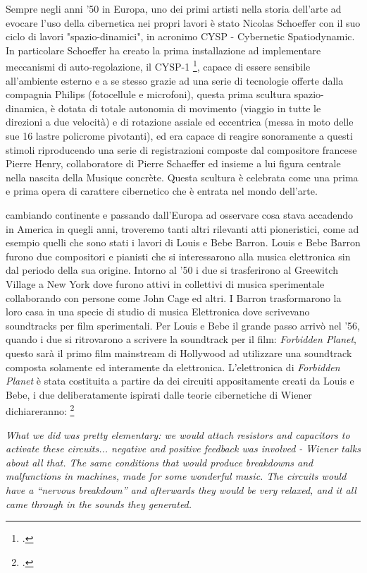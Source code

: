 Sempre negli anni '50 in Europa, uno dei primi artisti nella storia dell'arte
ad evocare l'uso della cibernetica nei propri lavori è stato
Nicolas Schoeffer con il suo ciclo di lavori "spazio-dinamici", in acronimo
CYSP - Cybernetic Spatiodynamic.
In particolare Schoeffer ha creato la prima installazione ad implementare meccanismi
di auto-regolazione, il CYSP-1 \footcite{sanfilippovallefeedsys},
capace di essere sensibile all'ambiente esterno e a se stesso
grazie ad una serie di tecnologie offerte dalla compagnia Philips (fotocellule e microfoni),
questa prima scultura spazio-dinamica, è dotata di totale autonomia di movimento
(viaggio in tutte le direzioni a due velocità) e di rotazione assiale ed eccentrica
(messa in moto delle sue 16 lastre policrome pivotanti),
ed era capace di reagire sonoramente a questi stimoli riproducendo
una serie di registrazioni composte dal compositore francese Pierre Henry,
collaboratore di Pierre Schaeffer ed insieme a lui figura centrale nella nascita della Musique concrète.
Questa scultura è celebrata come una prima e prima opera di carattere cibernetico
che è entrata nel mondo dell'arte.

cambiando continente e passando dall'Europa ad osservare cosa stava accadendo
in America in quegli anni, troveremo tanti altri rilevanti atti pioneristici,
come ad esempio quelli che sono stati i lavori di Louis e Bebe Barron.
Louis e Bebe Barron furono due compositori e pianisti che si
interessarono alla musica elettronica sin dal periodo della sua origine.
Intorno al '50 i due si trasferirono al Greewitch Village a New York
dove furono attivi in collettivi di musica sperimentale
collaborando con persone come John Cage ed altri.
I Barron trasformarono
la loro casa in una specie di studio di musica Elettronica
dove scrivevano soundtracks per film sperimentali.
Per Louis e Bebe il grande passo arrivò nel
'56, quando i due si ritrovarono a scrivere la soundtrack per il film:
\textit{Forbidden Planet},
questo sarà il primo film mainstream di Hollywood ad utilizzare una soundtrack
composta solamente ed interamente da elettronica.
L'elettronica di \textit{Forbidden Planet} è stata
costituita a partire da dei circuiti appositamente creati da Louis e Bebe,
i due deliberatamente ispirati dalle teorie cibernetiche di Wiener
dichiareranno: \footcite{dunbarlisteningcyb}

\begin{center}
\vspace{0.5cm}
\textit{What we did was pretty elementary: we would attach resistors and capacitors
to activate these
circuits... negative and positive feedback was involved - Wiener
talks about all that. The same
conditions that would produce breakdowns and malfunctions in machines,
made for some
wonderful music. The circuits would have a “nervous breakdown”
and afterwards they would be
very relaxed, and it all came through in the sounds they generated.}
\vspace{0.5cm}
\end{center}


